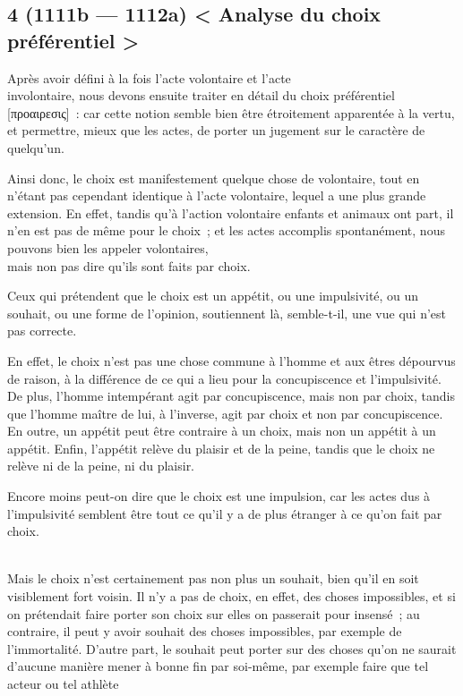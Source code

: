 \documentclass[french,twoside]{book} %
\begin{document}
\subsection[{4 (1111b — 1112a) < Analyse du choix préférentiel >}]{4 (1111b — 1112a) < Analyse du choix préférentiel >}
\noindent Après avoir défini à la fois l’acte volontaire et l’acte \\
involontaire, nous devons ensuite traiter en détail du choix préférentiel [προαιρεσις] : car cette notion semble bien être étroitement apparentée à la vertu, et permettre, mieux que les actes, de porter un jugement sur le caractère de quelqu’un.\par
Ainsi donc, le choix est manifestement quelque chose de volontaire, tout en n’étant pas cependant identique à l’acte volontaire, lequel a une plus grande extension. En effet, tandis qu’à l’action volontaire enfants et animaux ont part, il n’en est pas de même pour le choix ; et les actes accomplis spontanément, nous pouvons bien les appeler volontaires, \\
mais non pas dire qu’ils sont faits par choix.\par
Ceux qui prétendent que le choix est un appétit, ou une impulsivité, ou un souhait, ou une forme de l’opinion, soutiennent là, semble-t-il, une vue qui n’est pas correcte.\par
En effet, le choix n’est pas une chose commune à l’homme et aux êtres dépourvus de raison, à la différence de ce qui a lieu pour la concupiscence et l’impulsivité. De plus, l’homme intempérant agit par concupiscence, mais non par choix, tandis \\
que l’homme maître de lui, à l’inverse, agit par choix et non par concupiscence. En outre, un appétit peut être contraire à un choix, mais non un appétit à un appétit. Enfin, l’appétit relève du plaisir et de la peine, tandis que le choix ne relève ni de la peine, ni du plaisir.\par
Encore moins peut-on dire que le choix est une impulsion, car les actes dus à l’impulsivité semblent être tout ce qu’il y a de plus étranger à ce qu’on fait par choix.\par
\\
Mais le choix n’est certainement pas non plus un souhait, bien qu’il en soit visiblement fort voisin. Il n’y a pas de choix, en effet, des choses impossibles, et si on prétendait faire porter son choix sur elles on passerait pour insensé ; au contraire, il peut y avoir souhait des choses impossibles, par exemple de l’immortalité. D’autre part, le souhait peut porter sur des choses qu’on ne saurait d’aucune manière mener à bonne fin par soi-même, par exemple faire que tel acteur ou tel athlète \\
\end{document}
